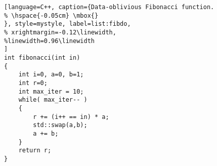 \begin{figure}
\begin{minipage}{\linewidth}
\begin{lstlisting}[language=C++, caption={Data-oblivious Fibonacci function.
% \hspace{-0.05cm} \mbox{}
}, style=mystyle, label=list:fibdo,
% xrightmargin=-0.12\linewidth,
%linewidth=0.96\linewidth
]
int fibonacci(int in)
{
    int i=0, a=0, b=1;
    int r=0;
    int max_iter = 10;
    while( max_iter-- )
    {
        r += (i++ == in) * a;
        std::swap(a,b);
        a += b;
    }
    return r;
}
\end{lstlisting}
\end{minipage}
\vspace{-0.2in}
\end{figure}
